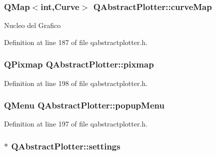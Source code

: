 \subsubsection[{curve\+Map}]{\setlength{\rightskip}{0pt plus 5cm}Q\+Map$<$int,{\bf Curve}$>$ Q\+Abstract\+Plotter\+::curve\+Map\hspace{0.3cm}{\ttfamily [protected]}}\label{class_q_abstract_plotter_a4d4f8fc4f2672d09cab0271a02968d59}
Nucleo del Grafico 

Definition at line 187 of file qabstractplotter.\+h.

\hypertarget{class_q_abstract_plotter_a2d7f15962892242af9ed0333272a4d11}{}
\subsubsection[{pixmap}]{\setlength{\rightskip}{0pt plus 5cm}Q\+Pixmap Q\+Abstract\+Plotter\+::pixmap\hspace{0.3cm}{\ttfamily [protected]}}\label{class_q_abstract_plotter_a2d7f15962892242af9ed0333272a4d11}


Definition at line 198 of file qabstractplotter.\+h.

\hypertarget{class_q_abstract_plotter_abcadf5621577060aca59f8afeba4b158}{}
\subsubsection[{popup\+Menu}]{\setlength{\rightskip}{0pt plus 5cm}Q\+Menu Q\+Abstract\+Plotter\+::popup\+Menu\hspace{0.3cm}{\ttfamily [protected]}}\label{class_q_abstract_plotter_abcadf5621577060aca59f8afeba4b158}


Definition at line 197 of file qabstractplotter.\+h.

\hypertarget{class_q_abstract_plotter_af070c9bf7a0beb0100ccd84f1ace901d}{}
\subsubsection[{settings}]{$\ast$ Q\+Abstract\+Plotter\+::settings\hspace{0.3cm}{\ttfamily [protected]}}\label{class_q_abstract_plotter_af070c9bf7a0beb0100ccd84f1ace901d}



